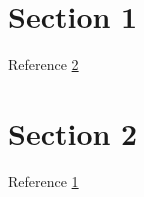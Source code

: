 \documentclass{article}
\begin{document}
\section{Section 1}\label{sec:A}
Reference \ref{sec:B}
\section{Section 2}\label{sec:B}
Reference \ref{sec:A}
\end{document}
